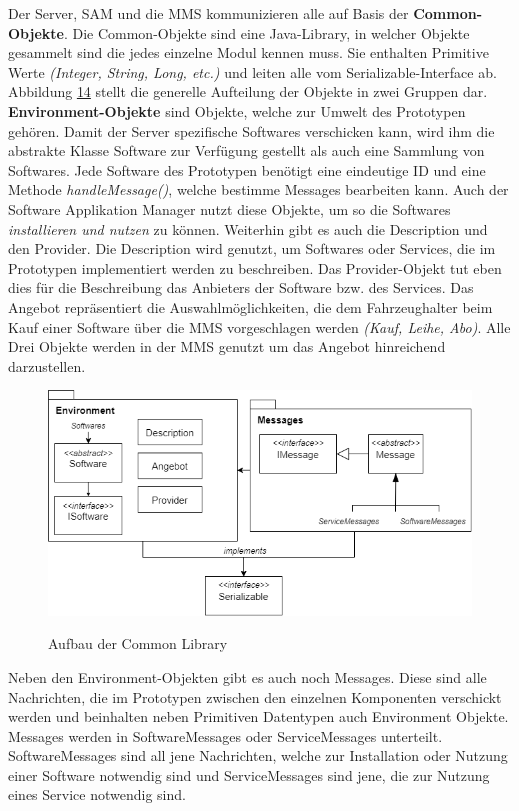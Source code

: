 Der Server, SAM und die MMS kommunizieren alle auf Basis der \textbf{Common-Objekte}. Die Common-Objekte sind eine Java-Library, in welcher Objekte gesammelt sind die jedes einzelne Modul kennen muss. Sie enthalten Primitive Werte \textit{(Integer, String, Long, etc.)} und leiten alle vom Serializable-Interface ab. Abbildung \hyperref[img:common]{14} stellt die generelle Aufteilung der Objekte in zwei Gruppen dar. \\

\textbf{Environment-Objekte} sind Objekte, welche zur Umwelt des Prototypen gehören. Damit der Server spezifische Softwares verschicken kann, wird ihm die abstrakte Klasse Software zur Verfügung gestellt als auch eine Sammlung von Softwares. Jede Software des Prototypen benötigt eine eindeutige ID und eine Methode \textit{handleMessage()}, welche bestimme Messages bearbeiten kann. Auch der Software Applikation Manager nutzt diese Objekte, um so die Softwares \textit{installieren und nutzen} zu können. Weiterhin gibt es auch die Description und den Provider. Die Description wird genutzt, um Softwares oder Services, die im Prototypen implementiert werden zu beschreiben. Das Provider-Objekt tut eben dies für die Beschreibung das Anbieters der Software bzw. des Services. Das Angebot repräsentiert die Auswahlmöglichkeiten, die dem Fahrzeughalter beim Kauf einer Software über die MMS vorgeschlagen werden \textit{(Kauf, Leihe, Abo)}. Alle Drei Objekte werden in der MMS genutzt um das Angebot hinreichend darzustellen.

\begin{figure}[!h]
	\centering
	\includegraphics[width=0.8\columnwidth]{pictures/konzept-Common.png}
	\label{img:common}
	\caption{Aufbau der Common Library}
\end{figure}

Neben den Environment-Objekten gibt es auch noch Messages. Diese sind alle Nachrichten, die im Prototypen zwischen den einzelnen Komponenten verschickt werden und beinhalten neben Primitiven Datentypen auch Environment Objekte. Messages werden in SoftwareMessages oder ServiceMessages unterteilt. SoftwareMessages sind all jene Nachrichten, welche zur Installation oder Nutzung einer Software notwendig sind und ServiceMessages sind jene, die zur Nutzung eines Service notwendig sind. 

